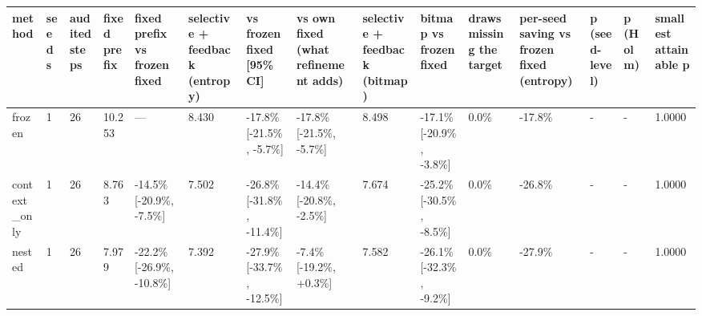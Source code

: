 \begin{tabular}{lllllllllllllll}
\hline
method & seeds & audited steps & fixed prefix & fixed prefix vs frozen fixed & selective + feedback (entropy) & vs frozen fixed [95\% CI] & vs own fixed (what refinement adds) & selective + feedback (bitmap) & bitmap vs frozen fixed & draws missing the target & per-seed saving vs frozen fixed (entropy) & p (seed-level) & p (Holm) & smallest attainable p \\
\hline
frozen & 1 & 26 & 10.253 & — & 8.430 & -17.8\% [-21.5\%, -5.7\%] & -17.8\% [-21.5\%, -5.7\%] & 8.498 & -17.1\% [-20.9\%, -3.8\%] & 0.0\% & -17.8\% & - & - & 1.0000 \\
context\_only & 1 & 26 & 8.763 & -14.5\% [-20.9\%, -7.5\%] & 7.502 & -26.8\% [-31.8\%, -11.4\%] & -14.4\% [-20.8\%, -2.5\%] & 7.674 & -25.2\% [-30.5\%, -8.5\%] & 0.0\% & -26.8\% & - & - & 1.0000 \\
nested & 1 & 26 & 7.979 & -22.2\% [-26.9\%, -10.8\%] & 7.392 & -27.9\% [-33.7\%, -12.5\%] & -7.4\% [-19.2\%, +0.3\%] & 7.582 & -26.1\% [-32.3\%, -9.2\%] & 0.0\% & -27.9\% & - & - & 1.0000 \\
\hline
\end{tabular}
